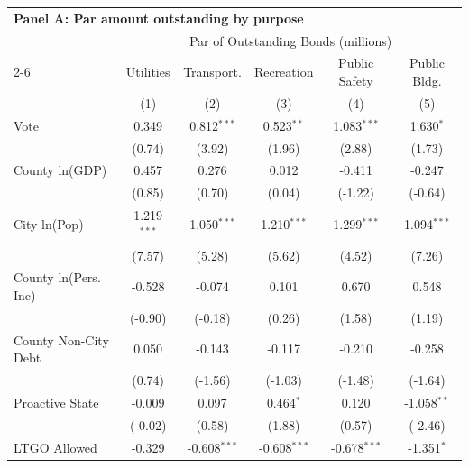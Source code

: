 \begingroup
\centering
\begin{tabular*}{\textwidth}{@{\extracolsep{\fill}}lccccc}
\multicolumn{6}{l}{\textbf{Panel A: Par amount outstanding by purpose}}\\

\addlinespace
   \toprule
    & \multicolumn{5}{c}{Par of Outstanding Bonds (millions)}\\
   \cmidrule(lr){2-6}
                        & Utilities     & Transport.     & Recreation     & Public Safety  & Public Bldg. \\   
                        & (1)           & (2)            & (3)            & (4)            & (5)\\  
   \midrule 
   Vote                 & 0.349         & 0.812$^{***}$  & 0.523$^{**}$   & 1.083$^{***}$  & 1.630$^{*}$\\   
                        & (0.74)       & (3.92)        & (1.96)        & (2.88)        & (1.73)\\   
   County ln(GDP)       & 0.457         & 0.276          & 0.012          & -0.411         & -0.247\\   
                        & (0.85)       & (0.70)        & (0.04)        & (-1.22)       & (-0.64)\\   
   City ln(Pop)         & 1.219$^{***}$ & 1.050$^{***}$  & 1.210$^{***}$  & 1.299$^{***}$  & 1.094$^{***}$\\   
                        & (7.57)       & (5.28)        & (5.62)        & (4.52)        & (7.26)\\   
   County ln(Pers. Inc) & -0.528        & -0.074         & 0.101          & 0.670          & 0.548\\   
                        & (-0.90)      & (-0.18)       & (0.26)        & (1.58)        & (1.19)\\   
   County Non-City Debt & 0.050         & -0.143         & -0.117         & -0.210         & -0.258\\   
                        & (0.74)       & (-1.56)       & (-1.03)       & (-1.48)       & (-1.64)\\   
   Proactive State      & -0.009        & 0.097          & 0.464$^{*}$    & 0.120          & -1.058$^{**}$\\   
                        & (-0.02)      & (0.58)        & (1.88)        & (0.57)        & (-2.46)\\   
   LTGO Allowed         & -0.329        & -0.608$^{***}$ & -0.608$^{***}$ & -0.678$^{***}$ & -1.351$^{*}$\\   

\end{tabular*}
